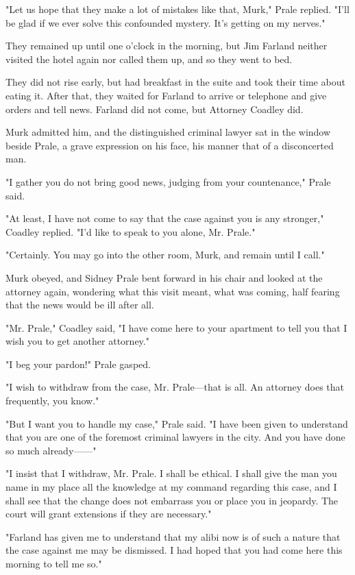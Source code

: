 \documentclass{novel}
\begin{document}
"Let us hope that they make a lot of mistakes like that, Murk," Prale replied. "I'll be glad if we ever solve this confounded mystery. It's getting on my nerves."

They remained up until one o'clock in the morning, but Jim Farland neither visited the hotel again nor called them up, and so they went to bed.

They did not rise early, but had breakfast in the suite and took their time about eating it. After that, they waited for Farland to arrive or telephone and give orders and tell news. Farland did not come, but Attorney Coadley did.

Murk admitted him, and the distinguished criminal lawyer sat in the window beside Prale, a grave expression on his face, his manner that of a disconcerted man.

"I gather you do not bring good news, judging from your countenance," Prale said.

"At least, I have not come to say that the case against you is any stronger," Coadley replied. "I'd like to speak to you alone, Mr. Prale."

"Certainly. You may go into the other room, Murk, and remain until I call."

Murk obeyed, and Sidney Prale bent forward in his chair and looked at the attorney again, wondering what this visit meant, what was coming, half fearing that the news would be ill after all.

"Mr. Prale," Coadley said, "I have come here to your apartment to tell you that I wish you to get another attorney."

"I beg your pardon!" Prale gasped.

"I wish to withdraw from the case, Mr. Prale---that is all. An attorney does that frequently, you know."

"But I want you to handle my case," Prale said. "I have been given to understand that you are one of the foremost criminal lawyers in the city. And you have done so much already------"

"I insist that I withdraw, Mr. Prale. I shall be ethical. I shall give the man you name in my place all the knowledge at my command regarding this case, and I shall see that the change does not embarrass you or place you in jeopardy. The court will grant extensions if they are necessary."

"Farland has given me to understand that my alibi now is of such a nature that the case against me may be dismissed. I had hoped that you had come here this morning to tell me so."
\end{document}
